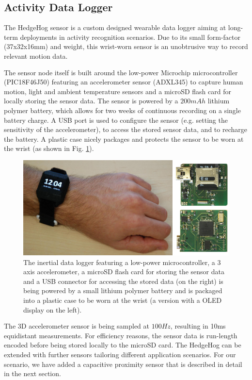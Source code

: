 \documentclass[runningheads,a4paper]{llncs}
\begin{document}
\subsection{Activity Data Logger}

The HedgeHog sensor \cite{hedgehog} is a custom designed wearable data logger aiming at long-term deployments in activity recognition scenarios. Due to its small form-factor (37x32x16mm) and weight, this wrist-worn sensor is an unobtrusive way to record relevant motion data.

The sensor node itself is built around the low-power Microchip microcontroller (PIC18F46J50) featuring an accelerometer sensor (ADXL345) to capture human motion, light and ambient temperature sensors and a microSD flash card for locally storing the sensor data. The sensor is powered by a $200mAh$ lithium polymer battery, which allows for two weeks of continuous recording on a single battery charge. A USB port is used to configure the sensor (e.g. setting the sensitivity of the accelerometer), to access the stored sensor data, and to recharge the battery. A plastic case nicely packages and protects the sensor to be worn at the wrist (as shown in Fig. \ref{fig:sensornode}).

\begin{figure}
	\centering
	\includegraphics[width=\textwidth]{Images/hardware_sensor_2.jpg}
	\caption{The inertial data logger featuring a low-power microcontroller, a 3 axis accelerometer, a microSD flash card for storing the sensor data and a USB connector for accessing the stored data (on the right) is being powered by a small lithium polymer battery and is packaged into a plastic case to be worn at the wrist (a version with a OLED display on the left).}
	\label{fig:sensornode}
\end{figure}

The 3D accelerometer sensor is being sampled at $100Hz$, resulting in 10ms equidistant measurements. For efficiency reasons, the sensor data is run-length encoded before being stored locally to the microSD card. The HedgeHog can be extended with further sensors tailoring different application scenarios. For our scenario, we have added a capacitive proximity sensor that is described in detail in the next section.
\end{document}
